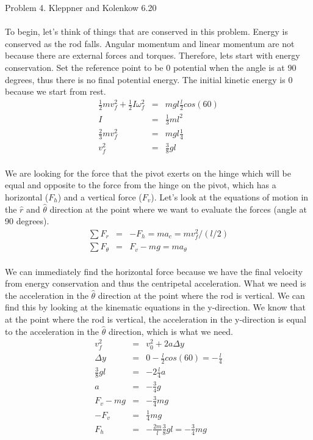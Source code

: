 \documentclass[11pt]{amsart}
\begin{document}
Problem 4. Kleppner and Kolenkow 6.20 \\ \\
To begin, let's think of things that are conserved in this problem. Energy is conserved as the rod falls. Angular momentum and linear momentum are not because there are external forces and torques. Therefore, lets start with energy conservation. Set the reference point to be 0 potential when the angle is at 90 degrees, thus there is no final potential energy. The initial kinetic energy is 0 because we start from rest.  \\
\begin{eqnarray*}
\frac{1}{2}mv_{f}^{2}+\frac{1}{2}I\omega_{f}^{2} &=& mgl\frac{l}{2}cos(60) \\
I &=& \frac{1}{3}ml^{2} \\
\frac{2}{3}mv_{f}^{2} &=& mgl\frac{1}{4} \\
v_{f}^{2} &=& \frac{3}{8}gl 
\end{eqnarray*} \\
We are looking for the force  that the pivot exerts on the hinge which will be equal and opposite to the force from the hinge on the pivot, which has a horizontal ($F_{h}$) and a vertical force ($F_{v}$). Let's look at the equations of motion in the $\hat{r}$ and $\hat{\theta}$ direction at the point where we want to evaluate the forces (angle at 90 degrees). \\
\begin{eqnarray*}
\sum{F_{r}} &=& -F_{h} = ma_{c} = mv_{f}^{2}/(l/2) \\
\sum{F_{\theta}} &=& F_{v}-mg = ma_{\theta} 
\end{eqnarray*} \\
We can immediately find the horizontal force because we have the final velocity from energy conservation and thus the centripetal acceleration. What we need is the acceleration in the $\hat{\theta}$ direction at the point where the rod is vertical. We can find this by looking at the kinematic equations in the y-direction. We know that at the point where the rod is vertical, the acceleration in the y-direction is equal to the acceleration in the $\hat{\theta}$ direction, which is what we need. \\
\begin{eqnarray*}
v_{f}^{2} &=& v_{0}^{2}+2a\Delta{y} \\
\Delta{y} &=&0-\frac{l}{2}cos(60) = -\frac{l}{4} \\
\frac{3}{8}gl &=& -2\frac{l}{4}a \\
a &=& -\frac{3}{4}g \\
F_{v}-mg &=& -\frac{3}{4}mg \\
-F_{v} &=& \frac{1}{4}mg \\
F_{h}&=& -\frac{2m}{l}\frac{3}{8}gl =-\frac{3}{4}mg 
\end{eqnarray*} \\
\end{document}

